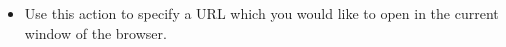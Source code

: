 \begin{itemize}
\item Use this action to specify a URL which you would like to open in the current window of the browser.
\end{itemize}

